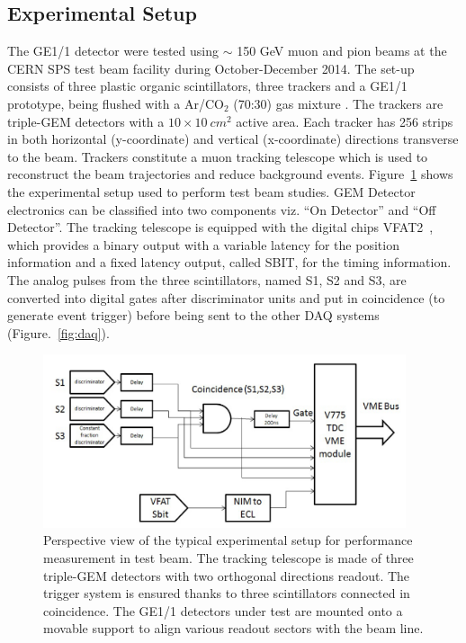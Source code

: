 \subsection{Experimental Setup}
The GE1/1 detector were tested using $\sim$ 150 GeV muon and pion beams at the CERN SPS test beam facility during October-December 2014. 
The set-up consists of three plastic organic scintillators, three trackers and a GE1/1 prototype, being flushed with a Ar/CO$_{2}$ (70:30) gas mixture . The trackers are triple-GEM detectors with a $10\times10~cm^2$ active area. Each tracker has 256 strips in both horizontal (y-coordinate) and vertical (x-coordinate) directions transverse to the beam. Trackers constitute a muon tracking telescope which is used to reconstruct the beam trajectories and reduce background events. Figure~\ref{fig:tbs} shows the experimental setup used to perform test beam studies.
GEM Detector electronics can be classified into two components viz. ``On Detector'' and ``Off Detector''.
The tracking telescope is equipped with the digital chips VFAT2~\cite{Aspell:2008zz}, which provides a binary output with a variable latency for the position information and a fixed latency output, called SBIT, for the timing information.
The analog pulses from the three scintillators, named S1, S2 and S3, are converted into digital gates after discriminator units and put in coincidence (to generate event trigger) before being sent to the other DAQ systems (Figure.~\ref{fig:daq}).
\begin{figure}[!htbp]
\centering
\includegraphics[width=0.95\textwidth]{figures/GEM/daq.png}
\caption{Perspective view of the typical experimental setup for performance measurement in test beam. The tracking telescope is made of three triple-GEM detectors with two orthogonal directions readout. The trigger system is ensured thanks to three scintillators connected in coincidence. The GE1/1 detectors under test are mounted onto a movable support to align various readout sectors with the beam line.}\label{fig:tbs}
\end{figure}

